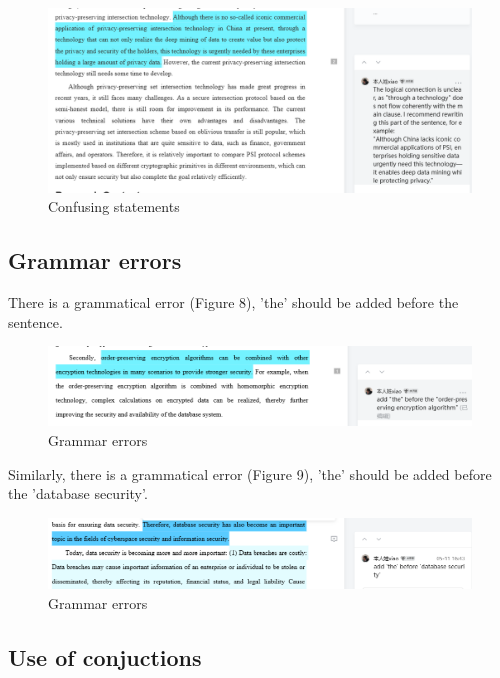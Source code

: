 \documentclass[sigconf]{acmart}
\begin{document}
\begin{figure}[h]
  \centering
  \includegraphics[width=\linewidth]{./picture/confusing_1.png}
  \caption{Confusing statements}
\end{figure}

\subsection{Grammar errors}

There is a grammatical error (Figure 8), 'the' should be added before the sentence.

\begin{figure}[h]
  \centering
  \includegraphics[width=\linewidth]{./picture/grammar_1.png}
  \caption{Grammar errors}
\end{figure}

Similarly, there is a grammatical error (Figure 9), 'the' should be added before the 'database security'.
\begin{figure}[h]
  \centering
  \includegraphics[width=\linewidth]{./picture/grammar_2.png}
  \caption{Grammar errors}
\end{figure}

\subsection{Use of conjuctions}
\end{document}
